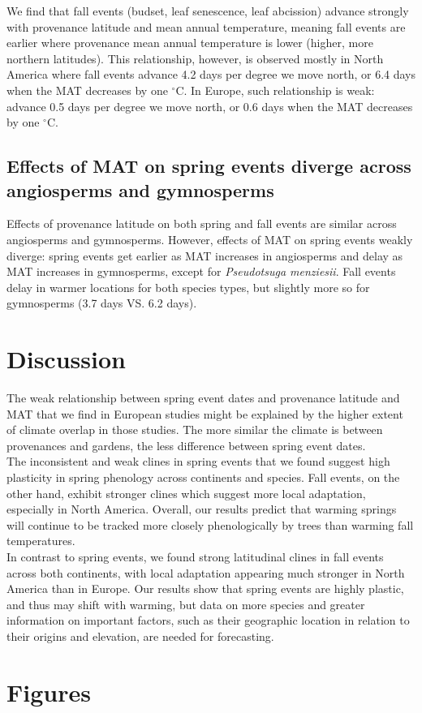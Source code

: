 \documentclass{article}
\begin{document}
We find that fall events (budset, leaf senescence, leaf abcission) advance strongly with provenance latitude and mean annual temperature, meaning fall events are earlier where provenance mean annual temperature is lower (higher, more northern latitudes). This relationship, however, is observed mostly in North America where fall events advance 4.2 days per degree we move north, or 6.4 days when the MAT decreases by one $^{\circ}$C. In Europe, such relationship is weak: advance 0.5 days per degree we move north, or 0.6 days when the MAT decreases by one $^{\circ}$C.

\subsection{Effects of MAT on spring events diverge across angiosperms and gymnosperms}

Effects of provenance latitude on both spring and fall events are similar across angiosperms and gymnosperms. However, effects of MAT on spring events weakly diverge: spring events get earlier as MAT increases in angiosperms and delay as MAT increases in gymnosperms, except for \emph{Pseudotsuga menziesii}. Fall events delay in warmer locations for both species types, but slightly more so for gymnosperms (3.7 days VS. 6.2 days).


\section{Discussion}




The weak relationship between spring event dates and provenance latitude and MAT that we find in European studies might be explained by the higher extent of climate overlap in those studies. The more similar the climate is between provenances and gardens, the less difference between spring event dates.
\\

The inconsistent and weak clines in spring events that we found suggest high plasticity in spring phenology across continents and species. Fall events, on the other hand, exhibit stronger clines which suggest more local adaptation, especially in North America. Overall, our results predict that warming springs will continue to be tracked more closely phenologically by trees than warming fall temperatures.
\\

In contrast to spring events, we found strong latitudinal clines in fall events across both continents, with local adaptation appearing much stronger in North America than in Europe. Our results show that spring events are highly plastic, and thus may shift with warming, but data on more species and greater information on important factors, such as their geographic location in relation to their origins and elevation, are needed for forecasting. 




\section{Figures}
\end{document}

